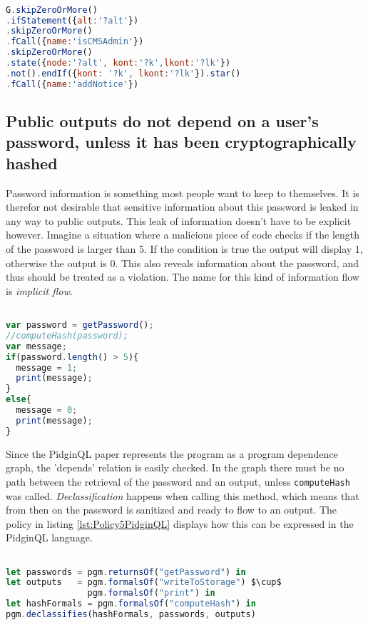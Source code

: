 \begin{lstlisting}[label={lst:Policy4JSQL},language=JavaScript,caption=Policy 4 in JS-QL]  % float=t?

G.skipZeroOrMore()
.ifStatement({alt:'?alt'})
.skipZeroOrMore()
.fCall({name:'isCMSAdmin'})
.skipZeroOrMore()
.state({node:'?alt', kont:'?k',lkont:'?lk'})
.not().endIf({kont: '?k', lkont:'?lk'}).star()
.fCall({name:'addNotice'})
\end{lstlisting}


\subsection{Public outputs do not depend on a user's password, unless it has been cryptographically hashed}

Password information is something most people want to keep to themselves. It is therefor not desirable that sensitive information about this password is leaked in any way to public outputs. This leak of information doesn't have to be explicit however. Imagine a situation where a malicious piece of code checks if the length of the password is larger than 5. If the condition is true the output will display 1, otherwise the output is 0. This also reveals information about the password, and thus should be treated as a violation. The name for this kind of information flow is \textit{implicit flow}.

\begin{lstlisting}[label={lst:PWDepends},language=JavaScript,caption=The output depends on the password example,mathescape=true]  % float=t?

var password = getPassword();
//computeHash(password);
var message;
if(password.length() > 5){
  message = 1;
  print(message);
}
else{
  message = 0;
  print(message);
}
\end{lstlisting}

Since the PidginQL paper represents the program as a program dependence graph, the 'depends' relation is easily checked. In the graph there must be no path between the retrieval of the password and an output, unless \texttt{computeHash} was called. \textit{Declassification} happens when calling this method, which means that from then on the password is sanitized and ready to flow to an output. The policy in listing \ref{lst:Policy5PidginQL} displays how this can be expressed in the PidginQL language.

\begin{lstlisting}[label={lst:Policy5PidginQL},language=JavaScript,caption=Policy 5 in PidginQL,mathescape=true]  % float=t?

let passwords = pgm.returnsOf("getPassword") in 
let outputs   = pgm.formalsOf("writeToStorage") $\cup$
                pgm.formalsOf("print") in
let hashFormals = pgm.formalsOf("computeHash") in
pgm.declassifies(hashFormals, passwords, outputs)
\end{lstlisting}


